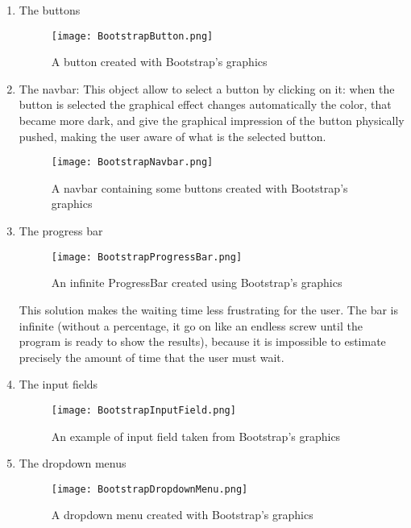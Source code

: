 \begin{enumerate}

\item The buttons

\begin{figure}[H]
\centering
\texttt{[image: BootstrapButton.png]} 
\caption{A button created with Bootstrap's graphics}
\end{figure}

\item The navbar:
This object allow to select a button by clicking on it: when the button is selected the graphical effect changes automatically the color, that became more dark, and give the graphical impression of the button physically pushed, making the user aware of what is the selected button. 

\begin{figure}[H]
\centering
\texttt{[image: BootstrapNavbar.png]} 
\caption{A navbar containing some buttons created with Bootstrap's graphics}
\end{figure}

\item The progress bar

\begin{figure}[H]
\centering
\texttt{[image: BootstrapProgressBar.png]} 
\caption{An infinite ProgressBar created using Bootstrap's graphics}
\end{figure}

This solution makes the waiting time less frustrating for the user. The bar is infinite (without a percentage, it go on like an endless screw until the program is ready to show the results), because it is impossible to estimate precisely the amount of time that the user must wait.

\item The input fields

\begin{figure}[H]
\centering
\texttt{[image: BootstrapInputField.png]} 
\caption{An example of input field taken from Bootstrap's graphics}
\end{figure}

\item The dropdown menus

\begin{figure}[H]
\centering
\texttt{[image: BootstrapDropdownMenu.png]} 
\caption{A dropdown menu created with Bootstrap's graphics}
\end{figure}


\end{enumerate}
